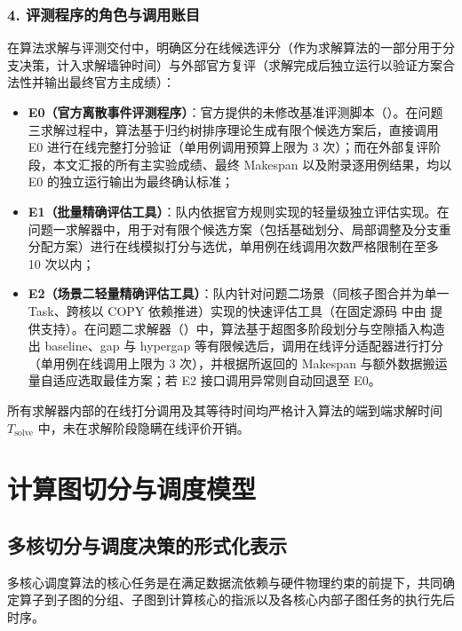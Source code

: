 \documentclass[anonymous,notoc]{gmcm2026}
\providecommand{\tightlist}{\setlength{\itemsep}{0pt}\setlength{\parskip}{0pt}}
\begin{document}
\subsubsection{4. 评测程序的角色与调用账目}

在算法求解与评测交付中，明确区分在线候选评分（作为求解算法的一部分用于分支决策，计入求解墙钟时间）与外部官方复评（求解完成后独立运行以验证方案合法性并输出最终官方主成绩）：

\begin{itemize}
\tightlist
\item
  \textbf{E0（官方离散事件评测程序）}：官方提供的未修改基准评测脚本（\texttt{}）。在问题三求解过程中，算法基于归约树排序理论生成有限个候选方案后，直接调用 E0 进行在线完整打分验证（单用例调用预算上限为 3 次）；而在外部复评阶段，本文汇报的所有主实验成绩、最终 Makespan 以及附录逐用例结果，均以 E0 的独立运行输出为最终确认标准；
\item
  \textbf{E1（批量精确评估工具）}：队内依据官方规则实现的轻量级独立评估实现。在问题一求解器中，用于对有限个候选方案（包括基础划分、局部调整及分支重分配方案）进行在线模拟打分与选优，单用例在线调用次数严格限制在至多 10 次以内；
\item
  \textbf{E2（场景二轻量精确评估工具）}：队内针对问题二场景（同核子图合并为单一 Task、跨核以 COPY 依赖推进）实现的快速评估工具（在固定源码 \texttt{} 中由 \texttt{} 提供支持）。在问题二求解器（\texttt{}）中，算法基于超图多阶段划分与空隙插入构造出 baseline、gap 与 hypergap 等有限候选后，调用在线评分适配器进行打分（单用例在线调用上限为 3 次），并根据所返回的 Makespan 与额外数据搬运量自适应选取最佳方案；若 E2 接口调用异常则自动回退至 E0。
\end{itemize}

所有求解器内部的在线打分调用及其等待时间均严格计入算法的端到端求解时间 \(T_{\text{solve}}\) 中，未在求解阶段隐瞒在线评价开销。


\section{计算图切分与调度模型}

\subsection{多核切分与调度决策的形式化表示}

多核心调度算法的核心任务是在满足数据流依赖与硬件物理约束的前提下，共同确定算子到子图的分组、子图到计算核心的指派以及各核心内部子图任务的执行先后时序。
\end{document}
